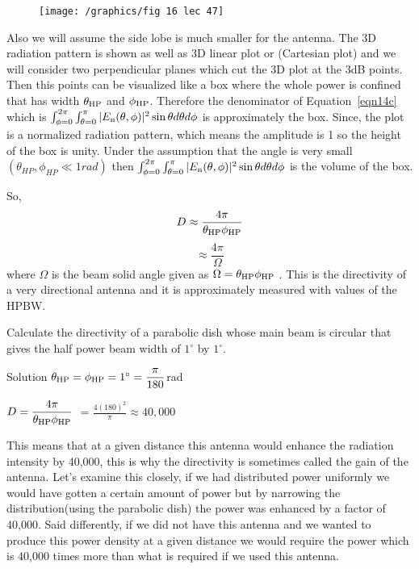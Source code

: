 \begin{enumerate}
\begin{figure}[h]
\centering
\texttt{[image: /graphics/fig 16 lec 47]}
\label{figure16}
\end{figure}

Also we will assume the side lobe is much smaller for the antenna. The 3D radiation pattern is shown as well as 3D linear plot or (Cartesian plot) and we will consider two perpendicular planes which cut the 3D plot at the 3dB points. Then this points can be visualized like a box where the whole power is confined that has width $\theta_{\textnormal{HP}}$ and $\phi_{\textnormal{HP}}$. Therefore the denominator of Equation~\ref{eqn14c} which is $\int_{\phi=0}^{2\pi} \int_{\theta=0}^{\pi}|E_{\textnormal{n}}(\theta, \phi)|^{2}\sin\theta d\theta d\phi$ is approximately the box.
Since, the plot is a normalized radiation pattern, which means the amplitude is 1 so the height of the box is unity. Under the assumption that the angle is very small $(\theta_{HP}, \phi_{HP} \ll 1rad)$ then $\int_{\phi=0}^{2\pi} \int_{\theta=0}^{\pi}|E_{\textnormal{n}}(\theta, \phi)|^{2}\sin\theta d\theta d\phi$ is the volume of the box.

So, 
$$D \approx \dfrac{4\pi}{\theta_{\textnormal{HP}}\phi_{\textnormal{HP}}}$$
$$\approx \frac{4\pi}{\Omega}$$
where $\Omega$ is the beam solid angle given as $\Omega =\theta_{\textnormal{HP}}\phi_{\textnormal{HP}} $ .
This is the directivity of a very directional antenna and it is approximately measured with values of the HPBW.	
\end{enumerate}	
\begin{exmp}
Calculate the directivity of a parabolic dish whose main beam is circular that gives the half power beam width of $1^\circ$ by $1^\circ$.
\begin{center}
Solution
$\theta_{\textnormal{HP}} =\phi_{\textnormal{HP}} =1^{\circ
}=\dfrac{\pi}{180}$rad


$D=\dfrac{4\pi}{\theta_{\textnormal{HP}}\phi_{\textnormal{HP}}}$
$= \frac{4(180)^2}{\pi} \approx 40,000$
\end{center}
\end{exmp}

This means that at a given distance this antenna would enhance the radiation intensity by 40,000, this is why the directivity is sometimes called the gain of the antenna. Let's examine this closely, if we had distributed power uniformly we would have gotten a certain amount of power but by narrowing the distribution(using the parabolic dish) the power was enhanced by a factor of 40,000. Said differently, if we did not have this antenna and we wanted to produce this power density at a given distance we would require the power which is 40,000 times more than what is required if we used this antenna.

